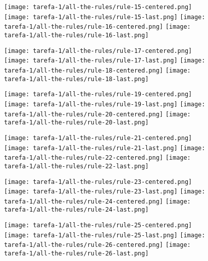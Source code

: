 \begin{figure}[htbp]
  \centering
\texttt{[image: tarefa-1/all-the-rules/rule-15-centered.png]}
\texttt{[image: tarefa-1/all-the-rules/rule-15-last.png]}
\texttt{[image: tarefa-1/all-the-rules/rule-16-centered.png]}
\texttt{[image: tarefa-1/all-the-rules/rule-16-last.png]}
\end{figure}
\begin{figure}[htbp]
  \centering
\texttt{[image: tarefa-1/all-the-rules/rule-17-centered.png]}
\texttt{[image: tarefa-1/all-the-rules/rule-17-last.png]}
\texttt{[image: tarefa-1/all-the-rules/rule-18-centered.png]}
\texttt{[image: tarefa-1/all-the-rules/rule-18-last.png]}
\end{figure}
\begin{figure}[htbp]
  \centering
\texttt{[image: tarefa-1/all-the-rules/rule-19-centered.png]}
\texttt{[image: tarefa-1/all-the-rules/rule-19-last.png]}
\texttt{[image: tarefa-1/all-the-rules/rule-20-centered.png]}
\texttt{[image: tarefa-1/all-the-rules/rule-20-last.png]}
\end{figure}
\begin{figure}[htbp]
  \centering
\texttt{[image: tarefa-1/all-the-rules/rule-21-centered.png]}
\texttt{[image: tarefa-1/all-the-rules/rule-21-last.png]}
\texttt{[image: tarefa-1/all-the-rules/rule-22-centered.png]}
\texttt{[image: tarefa-1/all-the-rules/rule-22-last.png]}
\end{figure}
\begin{figure}[htbp]
  \centering
\texttt{[image: tarefa-1/all-the-rules/rule-23-centered.png]}
\texttt{[image: tarefa-1/all-the-rules/rule-23-last.png]}
\texttt{[image: tarefa-1/all-the-rules/rule-24-centered.png]}
\texttt{[image: tarefa-1/all-the-rules/rule-24-last.png]}
\end{figure}
\begin{figure}[htbp]
  \centering
\texttt{[image: tarefa-1/all-the-rules/rule-25-centered.png]}
\texttt{[image: tarefa-1/all-the-rules/rule-25-last.png]}
\texttt{[image: tarefa-1/all-the-rules/rule-26-centered.png]}
\texttt{[image: tarefa-1/all-the-rules/rule-26-last.png]}
\end{figure}
